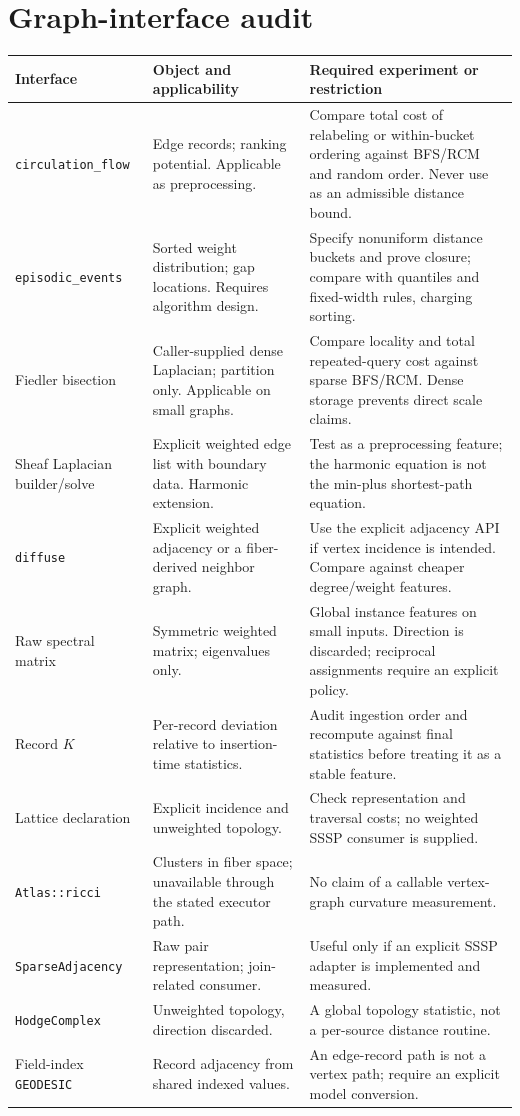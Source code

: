 \documentclass[11pt]{article}
\newcommand{\code}[1]{\texttt{#1}}
\begin{document}
\section{Graph-interface audit}\label{app:verbs}
\small
\begin{longtable}{>{\raggedright\arraybackslash}p{.24\linewidth}>{\raggedright\arraybackslash}p{.30\linewidth}>{\raggedright\arraybackslash}p{.38\linewidth}}
\toprule Interface & Object and applicability & Required experiment or restriction\\\midrule\endhead
\code{circulation\_flow} & Edge records; ranking potential. Applicable as preprocessing. & Compare total cost of relabeling or within-bucket ordering against BFS/RCM and random order. Never use as an admissible distance bound.\\
\code{episodic\_events} & Sorted weight distribution; gap locations. Requires algorithm design. & Specify nonuniform distance buckets and prove closure; compare with quantiles and fixed-width rules, charging sorting.\\
Fiedler bisection & Caller-supplied dense Laplacian; partition only. Applicable on small graphs. & Compare locality and total repeated-query cost against sparse BFS/RCM. Dense storage prevents direct scale claims.\\
Sheaf Laplacian builder/solve & Explicit weighted edge list with boundary data. Harmonic extension. & Test as a preprocessing feature; the harmonic equation is not the min-plus shortest-path equation.\\
\code{diffuse} & Explicit weighted adjacency or a fiber-derived neighbor graph. & Use the explicit adjacency API if vertex incidence is intended. Compare against cheaper degree/weight features.\\
Raw spectral matrix & Symmetric weighted matrix; eigenvalues only. & Global instance features on small inputs. Direction is discarded; reciprocal assignments require an explicit policy.\\
Record $K$ & Per-record deviation relative to insertion-time statistics. & Audit ingestion order and recompute against final statistics before treating it as a stable feature.\\
Lattice declaration & Explicit incidence and unweighted topology. & Check representation and traversal costs; no weighted SSSP consumer is supplied.\\
\code{Atlas::ricci} & Clusters in fiber space; unavailable through the stated executor path. & No claim of a callable vertex-graph curvature measurement.\\
\code{SparseAdjacency} & Raw pair representation; join-related consumer. & Useful only if an explicit SSSP adapter is implemented and measured.\\
\code{HodgeComplex} & Unweighted topology, direction discarded. & A global topology statistic, not a per-source distance routine.\\
Field-index \code{GEODESIC} & Record adjacency from shared indexed values. & An edge-record path is not a vertex path; require an explicit model conversion.\\
\bottomrule
\end{longtable}
\end{document}

